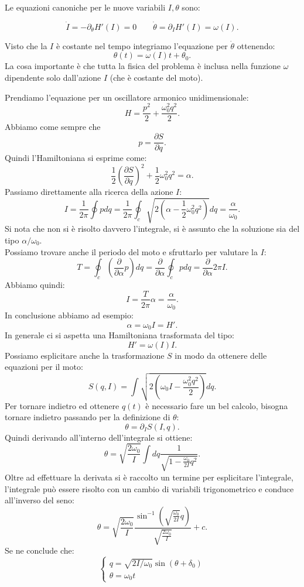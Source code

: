 Le equazioni canoniche per le nuove variabili $I,\theta$ sono:
\begin{redbox}{}
\[
    \dot{I}=-\partial_{\theta  }H'(I) = 0 \qquad \dot{\theta} = \partial_{I}H'(I) = \omega (I) 
.\]    
\end{redbox}
\noindent
Visto che la $I$  è costante nel tempo integriamo l'equazione per $\dot{\theta}$  ottenendo:
\[
    \theta (t) = \omega (I) t + \theta_0
.\] 
La cosa importante è che tutta la fisica del problema è inclusa nella funzione $\omega$ dipendente solo dall'azione $I$ (che è costante del moto).
\begin{exmp}
    Prendiamo l'equazione per un oscillatore armonico unidimensionale:
    \[
        H = \frac{p^2}{2} + \frac{\omega^2_0 q^2}{2}
    .\] 
    Abbiamo come sempre che
    \[
        p = \frac{\partial S}{\partial q} 
    .\] 
    Quindi l'Hamiltoniana si esprime come:
    \[
        \frac{1}{2}\left(\frac{\partial S}{\partial q} \right)^2 + \frac{1}{2} \omega_0^2q^2 = \alpha
    .\] 
    Passiamo direttamente alla ricerca della azione $I$:
    \[
	I = \frac{1}{2\pi}\oint pdq = \frac{1}{2\pi}\oint _c \sqrt{2(\alpha-\frac{1}{2}\omega_0^2q^2) }dq = \frac{\alpha}{\omega_0}
    .\] 
    Si nota che non si è risolto davvero l'integrale, si è assunto che la soluzione sia del tipo $\alpha  / \omega_0$.\\
    Possiamo trovare anche il periodo del moto e sfruttarlo per valutare la $I$:
    \[
        T = \oint _c\left(\frac{\partial }{\partial \alpha} p\right)dq = \frac{\partial }{\partial \alpha} \oint _cpdq = \frac{\partial }{\partial \alpha} 2\pi I  
    .\] 
    Abbiamo quindi:
    \[
        I = \frac{T}{2\pi}\alpha  = \frac{\alpha}{\omega_0}
    .\] 
    In conclusione abbiamo ad esempio:
    \[
        \alpha  = \omega_0I = H'
    .\] 
    In generale ci si aspetta una Hamiltoniana trasformata del tipo:
    \[
	H' = \omega (I) I
    .\] 
    Possiamo esplicitare anche la trasformazione $S$  in modo da ottenere delle equazioni per il moto:
    \[
	S(q,I) = \int\sqrt{2(\omega_0I- \frac{\omega_0^2q^2}{2})} dq
    .\] 
    Per tornare indietro ed ottenere $q(t)$ è necessario fare un bel calcolo, bisogna tornare indietro passando per la definizione di $\theta  $:
    \[
	\theta = \partial_{I}S(I,q) 
    .\] 
    Quindi derivando all'interno dell'integrale si ottiene:
    \[
	\theta  = \sqrt{\frac{2\omega_0}{I}} \int dq \frac{1}{\sqrt{1-\frac{\omega_0}{2I} q^2}}
    .\] 
    Oltre ad effettuare la derivata si è raccolto un termine per esplicitare l'integrale, l'integrale può essere risolto con un cambio di variabili trigonometrico e conduce all'inverso del seno:
    \[
	\theta  = \sqrt{\frac{2\omega_0}{I}} \frac{\sin^{-1}(\sqrt{\frac{\omega_0}{2I}} q)}{\sqrt{\frac{2\omega_0}{I}} } + c
    .\] 
    Se ne conclude che:
    \begin{equation}
        \begin{cases}
	    q = \sqrt{2I /\omega_0} \sin (\theta  + \delta_0) \\
	    \theta  = \omega_0t
        \end{cases}
	\label{eq:16_q}
    \end{equation}
\end{exmp}
\noindent
